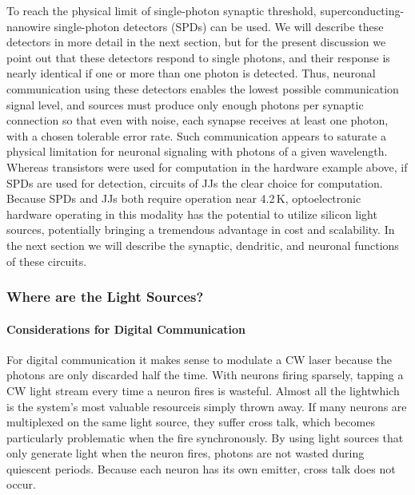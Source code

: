 To reach the physical limit of single-photon synaptic threshold, superconducting-nanowire single-photon detectors (SPDs) can be used. We will describe these detectors in more detail in the next section, but for the present discussion we point out that these detectors respond to single photons, and their response is nearly identical \cite{} if one or more than one photon is detected. Thus, neuronal communication using these detectors enables the lowest possible communication signal level, and sources must produce only enough photons per synaptic connection so that even with noise, each synapse receives at least one photon, with a chosen tolerable error rate. Such communication appears to saturate a physical limitation for neuronal signaling with photons of a given wavelength. Whereas transistors were used for computation in the hardware example above, if SPDs are used for detection, circuits of JJs the clear choice for computation. Because SPDs and JJs both require operation near 4.2\,K, optoelectronic hardware operating in this modality has the potential to utilize silicon light sources, potentially bringing a tremendous advantage in cost and scalability. In the next section we will describe the synaptic, dendritic, and neuronal functions of these circuits. 

\subsubsection{Where are the Light Sources?}

\paragraph{Considerations for Digital Communication}
\vspace{3em}
For digital communication it makes sense to modulate a CW laser because the photons are only discarded half the time. With neurons firing sparsely, tapping a CW light stream every time a neuron fires is wasteful. Almost all the light\textemdash which is the system's most valuable resource\textemdash is simply thrown away. If many neurons are multiplexed on the same light source, they suffer cross talk, which becomes particularly problematic when the fire synchronously. By using light sources that only generate light when the neuron fires, photons are not wasted during quiescent periods. Because each neuron has its own emitter, cross talk does not occur. 

